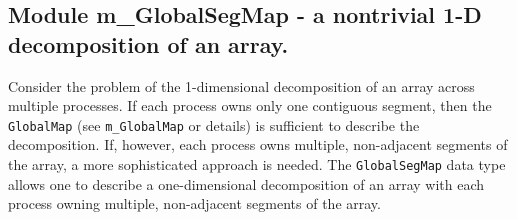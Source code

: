  
\parskip        0pt
\parindent      0pt
\baselineskip  11pt
 
\def\bv{\begin{verbatim}}
\def\ev{\end{verbatim}}
\def\be{\begin{equation}}
\def\ee{\end{equation}}
\def\bea{\begin{eqnarray}}
\def\eea{\end{eqnarray}}
\def\bi{\begin{itemize}}
\def\ei{\end{itemize}}
\def\bn{\begin{enumerate}}
\def\en{\end{enumerate}}
\def\bd{\begin{description}}
\def\ed{\end{description}}
\def\({\left (}
\def\){\right )}
\def\[{\left [}
\def\]{\right ]}
\def\<{\left  \langle}
\def\>{\right \rangle}
\def\cI{{\cal I}}
\def\diag{\mathop{\rm diag}}
\def\tr{\mathop{\rm tr}}
 

 \subsection{Module m\_GlobalSegMap - a nontrivial 1-D decomposition of an array.}


 
  Consider the problem of the 1-dimensional decomposition of an array 
  across multiple processes.  If each process owns only one contiguous 
  segment, then the {\tt GlobalMap} (see {\tt m\_GlobalMap} or details) 
  is sufficient to describe the decomposition.  If, however, each  
  process owns multiple, non-adjacent segments of the array, a more 
  sophisticated approach is needed.   The {\tt GlobalSegMap} data type 
  allows one to describe a one-dimensional decomposition of an array
  with each process owning multiple, non-adjacent segments of the array.
 
